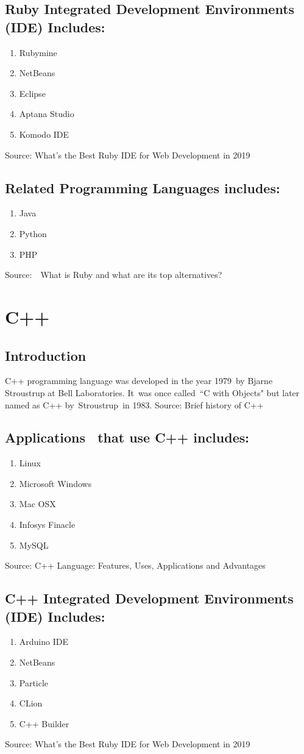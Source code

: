 \documentclass{article}
\begin{document}
\subsection{Ruby Integrated Development Environments (IDE) Includes:}
\begin{enumerate}
	\item Rubymine
	\item NetBeans
	\item Eclipse
	\item Aptana Studio
	\item Komodo IDE
\end{enumerate}
Source: What’s the Best Ruby IDE for Web Development in 2019
\subsection{Related Programming Languages includes:}
\begin{enumerate}
	\item Java
	\item Python
	\item PHP
\end{enumerate}
Source:  What is Ruby and what are its top alternatives?

\section{C++}
\subsection{Introduction}
C++ programming language was developed in the year 1979 by Bjarne Stroustrup at Bell Laboratories. It was once called “C with Objects" but later named as C++ by Stroustrup in 1983.
Source: Brief history of C++
\subsection{Applications  that use C++ includes:}
\begin{enumerate}
	\item Linux
	\item Microsoft Windows
	\item Mac OSX
	\item Infosys Finacle
	\item MySQL
\end{enumerate}
Source: C++ Language: Features, Uses, Applications and Advantages
\subsection{C++ Integrated Development Environments (IDE) Includes:}
\begin{enumerate}
	\item Arduino IDE
	\item NetBeans
	\item Particle
	\item CLion
	\item C++ Builder
\end{enumerate}
Source: What’s the Best Ruby IDE for Web Development in 2019
\end{document}
